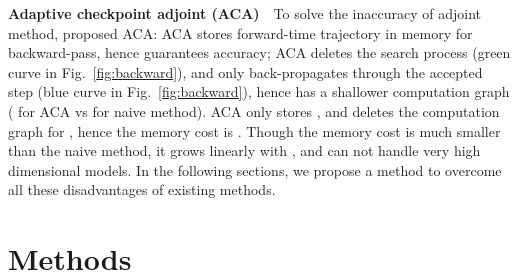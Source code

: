 \documentclass{article} \usepackage{iclr2021_conference,times}
\begin{document}
\textbf{Adaptive checkpoint adjoint (ACA)}\ \ 
To solve the inaccuracy of adjoint method, \citet{zhuang2020adaptive} proposed ACA: ACA stores forward-time trajectory in memory for backward-pass, hence guarantees accuracy; ACA deletes the search process (green curve in Fig.~\ref{fig:backward}), and only back-propagates through the accepted step (blue curve in Fig.~\ref{fig:backward}), hence has a shallower computation graph ( for ACA vs  for naive method). ACA only stores , and deletes the computation graph for , hence the memory cost is . Though the memory cost is much smaller than the naive method, it grows linearly with , and can not handle very high dimensional models. In the following sections, we propose a method to overcome all these disadvantages of existing methods.
\section{Methods}
\end{document}
